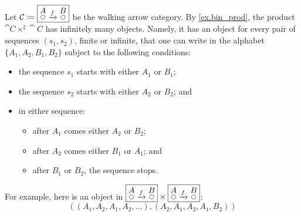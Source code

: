 \documentclass[Book-Poly]{subfiles}
\begin{document}
\begin{example}\label{ex.unexpectedly_many_objects}
Let $\cat{C}\coloneqq\fbox{$\LMO{A}\To{f}\LMO{B}$}$ be the walking arrow category. By \cref{ex.bin_prod}, the product $\cat{C}\times^\sharp\cat{C}$ has infinitely many objects. Namely, it has an object for every pair of sequences $(s_1, s_2)$, finite or infinite, that one can write in the alphabet $\{A_1, A_2, B_1, B_2\}$ subject to the following conditions:
\begin{itemize}
    \item the sequence $s_1$ starts with either $A_1$ or $B_1$;
    \item the sequence $s_2$ starts with either $A_2$ or $B_2$; and
	\item in either sequence:
	\begin{itemize}
	    \item after $A_1$ comes either $A_2$ or $B_2$;
	    \item after $A_2$ comes either $B_1$ or $A_1$; and
	    \item after $B_1$ or $B_2$, the sequence stops.
	\end{itemize}
\end{itemize}
For example, here is an object in $\fbox{$\LMO{A}\To{f}\LMO{B}$}\times\fbox{$\LMO{A}\To{f}\LMO{B}$}$:
\[
((A_1,A_2,A_1,A_2,\ldots), (A_2,A_1,A_2,A_1,B_2))
\]
\end{example}

\end{document}
